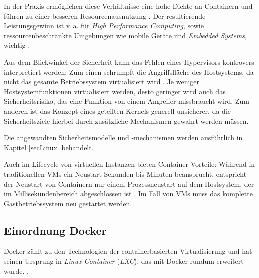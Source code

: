 \documentclass[../main.tex]{subfiles}
\begin{document}
			In der Praxis ermöglichen diese Verhältnisse eine hohe Dichte an Containern und führen zu einer besseren Resourcenausnutzung \cite[S.7f.]{dockerBook}. Der resultierende Leistungsgewinn ist v.\,a. für \emph{High Performance Computing}, sowie ressourcenbeschränkte Umgebungen wie mobile Geräte und \emph{Embedded Systems}, wichtig \cite[S.1]{dockerSec2}.

      Aus dem Blickwinkel der Sicherheit kann das Fehlen eines Hypervisors kontrovers interpretiert werden: Zum einen schrumpft die Angriffsfläche des Hostsystems, da nicht das gesamte Betriebssystem virtualisiert wird \cite[S.6]{dockerBook}. Je weniger Hostsystemfunktionen virtualisiert werden, desto geringer wird auch das Sicherheitsrisiko, das eine Funktion von einem Angreifer missbraucht wird. Zum anderen ist das Konzept eines geteilten Kernels generell unsicherer, da die Sicherheitsziele hierbei durch zusätzliche Mechanismen gewahrt werden müssen.

			Die angewandten Sicherheitsmodelle und -mechanismen werden ausführlich in Kapitel \ref{secLinux} behandelt.



			Auch im Lifecycle von virtuellen Instanzen bieten Container Vorteile: Während in traditionellen \acrshort{VM}s ein Neustart Sekunden bis Minuten beansprucht, entspricht der Neustart von Containern nur einem Prozessneustart auf dem Hostsystem, der im Millisekundenbereich abgeschlossen ist \cite[S.2]{dockerLXCKub}.
			Im Fall von VMs muss das komplette Gastbetriebssystem neu gestartet werden.

	  \subsection{Einordnung Docker}
      Docker zählt zu den Technologien der containerbasierten Virtualisierung und hat seinen Ursprung in \emph{Linux Container} (\emph{LXC}), das mit Docker rundum erweitert wurde. \cite[S.7]{dockerBook}\cite[S.1]{containerVirtPerformance}\cite[S.2]{dockerLXCKub}.
\end{document}
